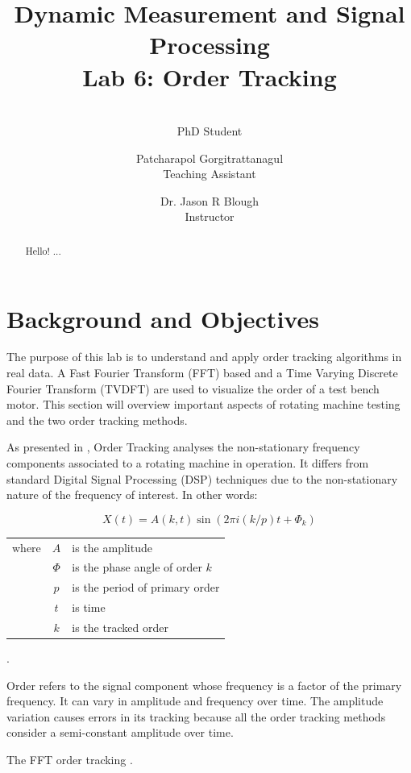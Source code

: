 \documentclass[10pt,letterpaper,twocolumn]{article}
\author{\makebox[.9\textwidth]{Guilherme Aramizo Ribeiro}\\PhD Student 
\and Patcharapol Gorgitrattanagul \\Teaching Assistant \and Dr. Jason R Blough\\Instructor}
\title{Dynamic Measurement and Signal Processing \\Lab 6: Order Tracking}
\begin{document}
\maketitle

\begin{abstract}
    Hello! ...
    
\end{abstract}

\section{Background and Objectives}

	The purpose of this lab is to understand and apply order tracking algorithms in real data. A Fast Fourier Transform (FFT) based and a Time Varying Discrete Fourier Transform (TVDFT) are used to visualize the order of a test bench motor. This section will overview important aspects of rotating machine testing and the two order tracking methods.
	
	As presented in \cite{blough1}, Order Tracking analyses the non-stationary frequency components associated to a rotating machine in operation. It differs from standard Digital Signal Processing (DSP) techniques due to the non-stationary nature of the frequency of interest. In other words:
	
	\begin{equation}
	X(t) = A(k,t)\sin(2 \pi i (k/p) t + \Phi _k)
	\end{equation}	 

	\begin{tabular}{r c m{5 cm}}
	where & $ A $ & is the amplitude \\ 
	 & $ \Phi $ & is the phase angle of order $ k $ \\ 
	 & $ p $ & is the period of primary order \\ 
	 & $ t $ & is time \\ 
	 & $ k $ & is the tracked order \\ 
	\end{tabular} 
	.
	
	Order refers to the signal component whose frequency is a factor of the primary frequency. It can vary in amplitude and frequency over time. The amplitude variation causes errors in its tracking because all the order tracking methods consider a semi-constant amplitude over time.
	
	The FFT order tracking .
	
\end{document}
